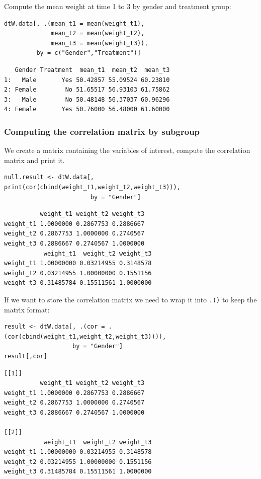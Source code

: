 \documentclass{article}
\begin{document}
Compute the mean weight at time 1 to 3 by gender and treatment group:
\lstset{language=r,label= ,caption= ,captionpos=b,numbers=none}
\begin{lstlisting}
dtW.data[, .(mean_t1 = mean(weight_t1),
             mean_t2 = mean(weight_t2),
             mean_t3 = mean(weight_t3)), 
         by = c("Gender","Treatment")]
\end{lstlisting}

\begin{verbatim}
   Gender Treatment  mean_t1  mean_t2  mean_t3
1:   Male       Yes 50.42857 55.09524 60.23810
2: Female        No 51.65517 56.93103 61.75862
3:   Male        No 50.48148 56.37037 60.96296
4: Female       Yes 50.76000 56.48000 61.60000
\end{verbatim}

\subsubsection{Computing the correlation matrix by subgroup}
\label{sec:org18f391f}

We create a matrix containing the variables of interest, compute the
correlation matrix and print it.
\lstset{language=r,label= ,caption= ,captionpos=b,numbers=none}
\begin{lstlisting}
null.result <- dtW.data[, print(cor(cbind(weight_t1,weight_t2,weight_t3))), 
                        by = "Gender"]
\end{lstlisting}

\begin{verbatim}
          weight_t1 weight_t2 weight_t3
weight_t1 1.0000000 0.2867753 0.2886667
weight_t2 0.2867753 1.0000000 0.2740567
weight_t3 0.2886667 0.2740567 1.0000000
           weight_t1  weight_t2 weight_t3
weight_t1 1.00000000 0.03214955 0.3148578
weight_t2 0.03214955 1.00000000 0.1551156
weight_t3 0.31485784 0.15511561 1.0000000
\end{verbatim}


If we want to store the correlation matrix we need to wrap it into
\texttt{.()} to keep the matrix format:
\lstset{language=r,label= ,caption= ,captionpos=b,numbers=none}
\begin{lstlisting}
result <- dtW.data[, .(cor = .(cor(cbind(weight_t1,weight_t2,weight_t3)))), 
                   by = "Gender"]
result[,cor]
\end{lstlisting}

\begin{verbatim}
[[1]]
          weight_t1 weight_t2 weight_t3
weight_t1 1.0000000 0.2867753 0.2886667
weight_t2 0.2867753 1.0000000 0.2740567
weight_t3 0.2886667 0.2740567 1.0000000

[[2]]
           weight_t1  weight_t2 weight_t3
weight_t1 1.00000000 0.03214955 0.3148578
weight_t2 0.03214955 1.00000000 0.1551156
weight_t3 0.31485784 0.15511561 1.0000000
\end{verbatim}
\end{document}
